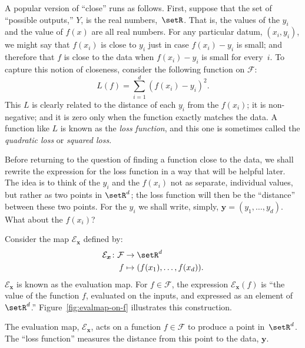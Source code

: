 \documentclass[10pt, a4paper]{article}
\begin{document}
A popular version of “close” runs as follows. First, suppose that the
set of “possible outputs,” $Y$, is the real numbers,~$\setR$. That is,
the values of the $y_i$ and the value of $f(x)$ are all real
numbers. For any particular datum, $(x_i, y_i)$, we might say that
$f(x_i)$ is close to $y_i$ just in case $ f(x_i)-y_i $ is small; and
therefore that $f$ is close to the data when $f(x_i)-y_i$ is small for
every~$i$. To capture this notion of closeness, consider the following
function on $\mathcal{F}$:
\begin{equation}
  \label{eq:square-loss}  
  L(f) = \sum_{i=1}^d{(f(x_i) - y_i)}^2.
\end{equation}
This $L$ is clearly related to the distance of each $y_i$ from the
$f(x_i)$; it is non-negative; and it is zero only when the function
exactly matches the data. A function like $L$ is known as the
\emph{loss function}, and this one is sometimes called the
\emph{quadratic loss} or \emph{squared loss}.

Before returning to the question of finding a function close to the
data, we shall rewrite the expression for the loss function in a way
that will be helpful later. The idea is to think of the $y_i$ and the
$f(x_i)$ not as separate, individual values, but rather as two points
in $\setR^d$; the loss function will then be the “distance” between
these two points. For the $y_i$ we shall write, simply,
$\bm{y}=(y_1,\dotsc,y_d)$. What about the $f(x_i)$?

Consider the map $\mathcal{E}_{\bm{x}}$ defined by:
\[
  \begin{aligned}
    \mathcal{E}_{\bm{x}} \colon \mathcal{F} &\to \setR^d \\
    f &\mapsto (f(x_1), \dotsc, f(x_d)).
  \end{aligned}
\]
$\mathcal{E}_{\bm{x}}$ is known as the evaluation map. For $f\in\mathcal{F}$, the expression
$\mathcal{E}_{\bm{x}}(f)$ is “the value of the function $f$, evaluated on the
inputs, and expressed as an element of~$\setR^d$.”
Figure~\ref{fig:evalmap-on-f} illustrates this construction.
\begin{marginfigure}
  \begin{center}
  \end{center}
  \caption{The evaluation map, $\mathcal{E}_{\bm{x}}$, acts on a function
    $f\in\mathcal{F}$ to produce a point in~$\setR^d$. The “loss function”
    measures the distance from this point to the data, 
    $\bm{y}$.\label{fig:evalmap-on-f}}
\end{marginfigure}
\end{document}
